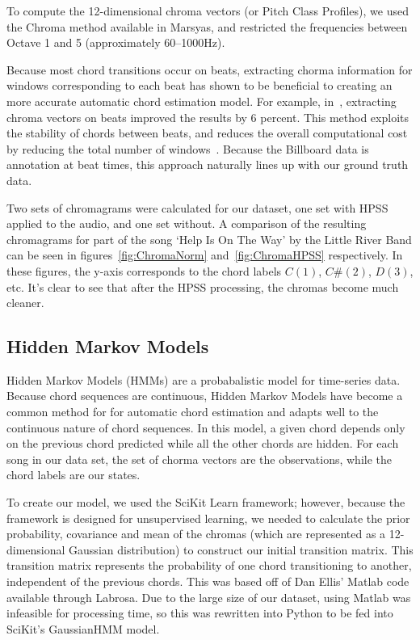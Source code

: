 \documentclass{article}
\begin{document}
To compute the 12-dimensional chroma vectors (or Pitch Class Profiles), we used
the Chroma method available in Marsyas, and restricted the frequencies between
Octave 1 and 5 (approximately 60--1000Hz).

Because most chord transitions occur on beats, extracting chorma information for
windows corresponding to each beat has shown to be beneficial to creating an
more accurate automatic chord estimation model. For example, in~\cite{Zenz:20},
extracting chroma vectors on beats improved the results by 6 percent. This method
exploits the stability of chords between beats, and reduces the overall computational
cost by reducing the total number of windows~\cite{McVicar:00}. Because the Billboard
data is annotation at beat times, this approach naturally lines up with our ground truth data.

Two sets of chromagrams were calculated for our dataset, one set with HPSS
applied to the audio, and one set without. A comparison of the resulting
chromagrams for part of the song `Help Is On The Way' by the Little River Band
can be seen in figures~\ref{fig:ChromaNorm} and~\ref{fig:ChromaHPSS}
respectively. In these figures, the y-axis corresponds to the chord labels
$C(1) $, $C\#(2)$, $D(3)$, etc. It's clear to see that after the HPSS processing, the
chromas become much cleaner.

\subsection{Hidden Markov Models}

Hidden Markov Models (HMMs) are a probabalistic model for time-series data. Because chord
sequences are continuous,  Hidden Markov Models have become a common method for
for automatic chord estimation and adapts well to the continuous nature of chord sequences.
In this model, a given chord depends only on the previous chord predicted while all the other chords
are hidden. For each song in our data set, the set of chorma vectors are the observations,
while the chord labels are our states.

To create our model, we used the SciKit Learn framework; however, because the
framework is designed for unsupervised learning, we needed to calculate the
prior probability, covariance and mean of the chromas  (which are represented as
a 12-dimensional Gaussian distribution) to construct our initial transition
matrix.  This transition matrix represents the probability of one chord
transitioning to another, independent of the previous chords.  This was based
off of Dan Ellis' Matlab code available through Labrosa. Due to the large size
of our dataset, using Matlab was infeasible for processing time, so this was
rewritten into Python to be fed into SciKit's GaussianHMM model.
\end{document}
